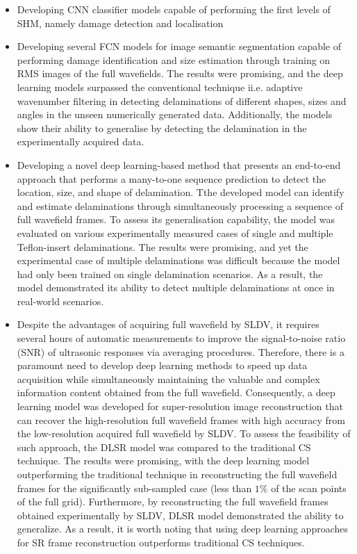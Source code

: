 \begin{itemize}
	\item Developing CNN classifier models capable of performing the first levels of SHM, namely damage detection and localisation
	\item Developing several FCN models for image semantic segmentation capable of performing damage identification and size estimation through training on RMS images of the full wavefields.
	The results were promising, and the deep learning models surpassed the conventional technique ii.e. adaptive wavenumber filtering in detecting delaminations of different shapes, sizes and angles in the unseen numerically generated data. 
	Additionally, the models show their ability to generalise by detecting the delamination in the experimentally acquired data.
	\item Developing a novel deep learning-based method that presents an end-to-end approach that performs a many-to-one sequence prediction to detect the location, size, and shape of delamination.
	Tthe developed model can identify and estimate delaminations through simultaneously processing a sequence of full wavefield frames.
	To assess its generalisation capability, the model was evaluated on various experimentally measured cases of single and multiple Teflon-insert delaminations.
	The results were promising, and yet the experimental case of multiple delaminations was difficult because the model had only been trained on single delamination scenarios.
	As a result, the model demonstrated its ability to detect multiple delaminations at once in real-world scenarios.
	\item Despite the advantages of acquiring full wavefield by SLDV, it requires several hours of automatic measurements to improve the signal-to-noise ratio (SNR) of ultrasonic responses via averaging procedures.
	Therefore, there is a paramount need to develop deep learning methods to speed up data acquisition while simultaneously maintaining the valuable and complex information content obtained from the full wavefield.
	Consequently, a deep learning model was developed for super-resolution image reconstruction that can recover the high-resolution full wavefield frames with high accuracy from the low-resolution acquired full wavefield by SLDV.
	To assess the feasibility of such approach, the DLSR model was compared to the traditional CS technique.
	The results were promising, with the deep learning model outperforming the traditional technique in reconstructing the full wavefield frames for the significantly sub-sampled case (less than $1\%$ of the scan points of the full grid).
	Furthermore, by reconstructing the full wavefield frames obtained experimentally by SLDV, DLSR model demonstrated the ability to generalize.
	As a result, it is worth noting that using deep learning approaches for SR frame reconstruction outperforms traditional CS techniques.
\end{itemize}
\clearpage
